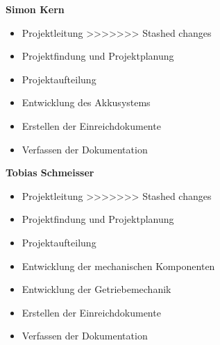 \newpage

\textbf{Simon Kern}
\begin{itemize}
<<<<<<< Updated upstream
=======
	\item Projektleitung
>>>>>>> Stashed changes
	\item Projektfindung und Projektplanung
	\item Projektaufteilung
	\item Entwicklung des Akkusystems
	\item Erstellen der Einreichdokumente
	\item Verfassen der Dokumentation
\end{itemize}
\bigskip

\textbf{Tobias Schmeisser}
\begin{itemize}
<<<<<<< Updated upstream
=======
	\item Projektleitung
>>>>>>> Stashed changes
	\item Projektfindung und Projektplanung
	\item Projektaufteilung
	\item Entwicklung der mechanischen Komponenten
	\item Entwicklung der Getriebemechanik
	\item Erstellen der Einreichdokumente	
	\item Verfassen der Dokumentation
\end{itemize}